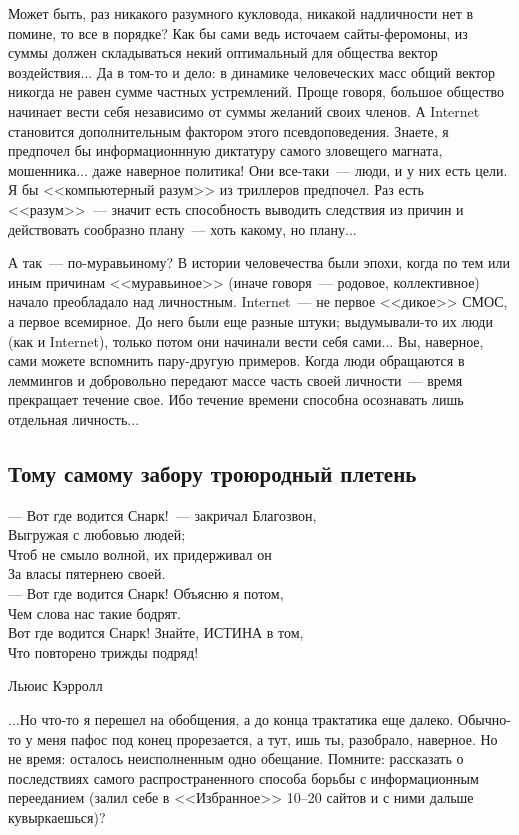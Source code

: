 \documentclass{scrbook}
\makeatletter
\newcommand{\defaultepigraphwidth}{0.5} %
\newcommand{\flqq}{<<}
\newcommand{\frqq}{>>}
\newcommand{\mdash}{~--- }
\newcommand{\ndash}{--}
\newcommand{\sdash}{--- } %
\newcommand{\essaysection}[1]{\subsection*{#1}\nopagebreak}
\newcommand{\myepigraph}[3][\@empty]{
	\ifx\@empty#1
		\setlength{\epigraphwidth}{\defaultepigraphwidth\textwidth}
	\else
		\setlength{\epigraphwidth}{#1\textwidth}
	\fi
	\epigraph{#2}{#3}
	\setlength{\epigraphwidth}{\defaultepigraphwidth\textwidth} %
	\nopagebreak
}
\makeatother
\begin{document}
Может быть, раз никакого разумного кукловода, никакой надличности нет в помине, то все в порядке? Как бы сами ведь источаем сайты-феромоны, из суммы должен складываться некий оптимальный для общества вектор воздействия... Да в том-то и дело: в динамике человеческих масс общий вектор никогда не равен сумме частных устремлений. Проще говоря, большое общество начинает вести себя независимо от суммы желаний своих членов. А Internet становится дополнительным фактором этого псевдоповедения. Знаете, я предпочел бы информационнную диктатуру самого зловещего магната, мошенника... даже наверное политика! Они все-таки{\mdash}люди, и у них есть цели. Я бы {\flqq}компьютерный разум{\frqq} из триллеров предпочел. Раз есть {\flqq}разум{\frqq}{\mdash}значит есть способность выводить следствия из причин и действовать сообразно плану{\mdash}хоть какому, но плану...

А так{\mdash}по-муравьиному? В истории человечества были эпохи, когда по тем или иным причинам {\flqq}муравьиное{\frqq} (иначе говоря{\mdash}родовое, коллективное) начало преобладало над личностным. Internet{\mdash}не первое {\flqq}дикое{\frqq} СМОС, а первое всемирное. До него были еще разные штуки; выдумывали-то их люди (как и Internet), только потом они начинали вести себя сами... Вы, наверное, сами можете вспомнить пару-другую примеров. Когда люди обращаются в леммингов и добровольно передают массе часть своей личности{\mdash}время прекращает течение свое. Ибо течение времени способна осознавать лишь отдельная личность...

\essaysection{Тому самому забору троюродный плетень}

\myepigraph{{\sdash} Вот где водится Снарк!{\mdash}закричал Благозвон, \\
Выгружая с любовью людей; \\
Чтоб не смыло волной, их придерживал он \\
За власы пятернею своей. \\
{\sdash} Вот где водится Снарк! Объясню я потом, \\
Чем слова нас такие бодрят. \\
Вот где водится Снарк! Знайте, ИСТИНА в том, \\
Что повторено трижды подряд!}
{Льюис Кэрролл}

...Но что-то я перешел на обобщения, а до конца трактатика еще далеко. Обычно-то у меня пафос под конец прорезается, а тут, ишь ты, разобрало, наверное. Но не время: осталось неисполненным одно обещание. Помните: рассказать о последствиях самого распространенного способа борьбы с информационным перееданием (залил себе в {\flqq}Избранное{\frqq} 10{\ndash}20 сайтов и с ними дальше кувыркаешься)?
\end{document}
